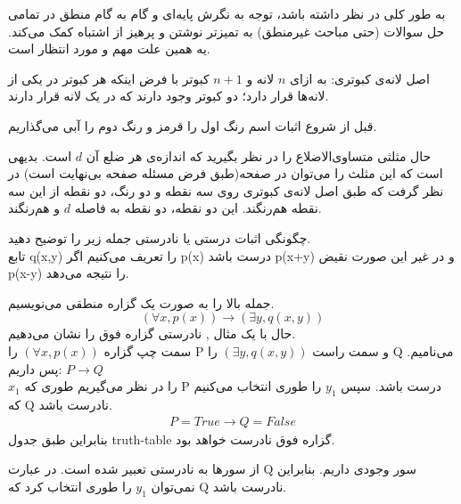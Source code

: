 \documentclass[11pt,largemargins]{h2wp}
\begin{document}
به‌ طور کلی در نظر داشته باشد، توجه به نگرش پایه‌ای و گام به گام منطق در تمامی حل سوالات (حتی مباحث غیرمنطق) به تمیزتر نوشتن و پرهیز از اشتباه کمک می‌کند. یه همین علت مهم و مورد انتظار است.\\

 
    اصل لانه‌ی کبوتری: به ازای 
    $n$
    لانه و 
    $n+1$
    کبوتر با فرض اینکه هر کبوتر در یکی از لانه‌ها قرار دارد؛ دو کبوتر وجود دارند که در یک لانه قرار دارند.

    قبل از شروع اثبات اسم رنگ اول را قرمز و رنگ دوم را آبی می‌گذاریم.

    حال مثلثی متساوی‌الاضلاع را در نظر بگیرید که اندازه‌ی هر ضلع آن
    $d$
    است. بدیهی است که این مثلث را می‌توان در صفحه‌(طبق فرض مسئله صفحه بی‌نهایت است)
    در نظر گرفت که طبق اصل لانه‌ی کبوتری روی سه نقطه و دو رنگ، دو نقطه از این سه نقطه هم‌ر‌‌نگند.
    این دو نقطه،
    دو نقطه به فاصله
    $d$
    و هم‌رنگند.
    
 \notes
 
    
  \question

چگونگی اثبات درستی یا نادرستی جمله زیر را توضیح دهید.\\
 تابع q(x,y) را تعریف می‌کنیم اگر p(x) درست باشد p(x+y) و در غیر این صورت نقیض p(x-y) را نتیجه می‌دهد. 
  
 
 
 \solution
 
 جمله بالا را به صورت یک گزاره منطقی می‌نویسیم.
  $$  (\forall x,p(x)) \rightarrow (\exists y, q(x,y)) $$
  حال با یک مثال , نادرستی گزاره فوق را نشان می‌دهیم.\\
 سمت چپ گزاره 
 $(\forall x,p(x))$
 را P
و سمت راست 
$ (\exists y, q(x,y)) $
را Q می‌نامیم.
پس داریم:
$ P \rightarrow Q $
\\
$x_1$
را در نظر می‌گیریم طوری که P درست باشد.
 سپس 
$ y_1 $
را طوری انتخاب می‌کنیم که Q نادرست باشد.
\begin{align*}
 P=True \rightarrow Q=False
\end{align*}
بنابراین طبق جدول truth-table
گزاره فوق نادرست خواهد بود.\\


 \notes
 
 از سورها به نادرستی تعبیر شده است. در عبارت Q سور وجودی داریم. بنابراین نمی‌توان $ y_1 $
را طوری انتخاب کرد که Q نادرست باشد.
 

 
\end{document}
